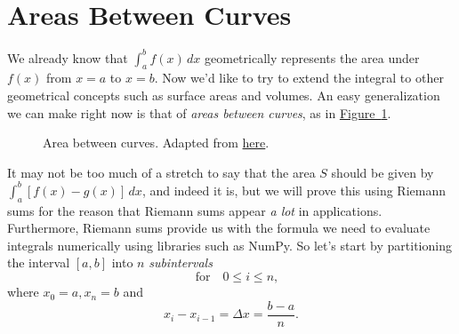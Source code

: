 \documentclass[10pt,]{book}
\theoremstyle{ptxplainnotitle}
\theoremstyle{ptxplaintitle}
\theoremstyle{ptxplainnotitle}
\theoremstyle{ptxplaintitle}
\theoremstyle{ptxplainnotitle}
\theoremstyle{ptxplaintitle}
\theoremstyle{ptxdefinitionnotitle}
\theoremstyle{ptxdefinitiontitle}
\theoremstyle{ptxdefinitionnotitle}
\theoremstyle{ptxdefinitiontitle}
\theoremstyle{ptxdefinitionnotitle}
\theoremstyle{ptxdefinitiontitle}
\theoremstyle{ptxdefinitionnotitle}
\theoremstyle{ptxdefinitiontitle}
\theoremstyle{ptxdefinitionnotitle}
\theoremstyle{ptxdefinitiontitle}
\numberwithin{equation}{section}
\begin{document}
\section[{Areas Between Curves}]{Areas Between Curves}\label{section-areas-between-curves}
\hypertarget{p-613}{}%
We already know that \(\int_{a}^{b}f(x)\,dx\) geometrically represents the area under \(f(x)\) from \(x = a\) to \(x = b\). Now we'd like to try to extend the integral to other geometrical concepts such as surface areas and volumes. An easy generalization we can make right now is that of \emph{areas between curves}, as in \hyperref[figure-area-between-curves]{Figure~\ref{figure-area-between-curves}}.%
\begin{figure}
\centering
{
}
\caption{Area between curves. Adapted from \href{https://tex.stackexchange.com/questions/164773/graphics-area-between-curves}{here}.\label{figure-area-between-curves}}
\end{figure}
\hypertarget{p-614}{}%
It may not be too much of a stretch to say that the area \(S\) should be given by \(\int_{a}^{b}[f(x) - g(x)]\,dx\), and indeed it is, but we will prove this using Riemann sums for the reason that Riemann sums appear \emph{a lot} in applications. Furthermore, Riemann sums provide us with the formula we need to evaluate integrals numerically using libraries such as NumPy. So let's start by partitioning the interval \([a,b]\) into \(n\) \emph{subintervals}%
\begin{equation*}
[x_{i-1},x_{i}]\quad\text{for}\quad 0\leq i\leq n,
\end{equation*}
where \(x_{0} = a, x_{n} = b\) and%
\begin{equation*}
x_{i} - x_{i-1} = \Delta x = \frac{b-a}{n}.
\end{equation*}
%
\par
\end{document}
